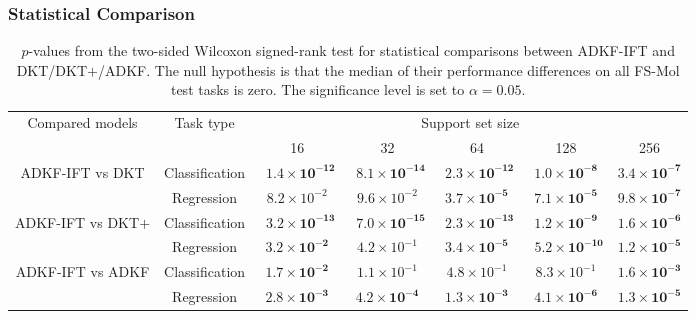         \subsubsection{Statistical Comparison}
        \begin{table}[ht]
            \tiny
            \caption[Results of Wilcoxon signed-rank test for ADKF-IFT's performance.]{$p$-values from the two-sided Wilcoxon signed-rank test for statistical comparisons between ADKF-IFT and DKT/DKT$+$/ADKF. The null hypothesis is that the median of their performance differences on all FS-Mol test tasks is zero. The significance level is set to $\alpha=0.05$.}
            \label{tab:statistical-comparisons}
            \centering
            \begin{tabular}{ccccccc}
                \toprule
                \multirow{2}[3]{*}{Compared models} & \multirow{2}[3]{*}{Task type} & \multicolumn{5}{c}{Support set size}\\
                \cmidrule(lr){3-7}
                & & 16 & 32 & 64 & 128 & 256 \\
                \midrule
                \multirow{2}[1]{*}{ADKF-IFT vs DKT} & Classification & $\;\:\mathbf{1.4\times10^{-12}}$ & $\;\:\mathbf{8.1\times10^{-14}}$ & $\:\,\mathbf{2.3\times10^{-12}}$ & $\mathbf{1.0\times10^{-8}}$ & $\mathbf{3.4\times10^{-7}}$ \\
                & Regression & $8.2\times10^{-2}$ & $9.6\times10^{-2}$ & $\mathbf{3.7\times10^{-5}}$ & $\mathbf{7.1\times10^{-5}}$ & $\mathbf{9.8\times10^{-7}}$ \\
                \midrule
                \multirow{2}[1]{*}{ADKF-IFT vs DKT$+$} & Classification & $\;\:\mathbf{3.2\times10^{-13}}$ & $\;\:\mathbf{7.0\times10^{-15}}$ & $\:\,\mathbf{2.3\times10^{-13}}$ & $\mathbf{1.2\times10^{-9}}$ & $\mathbf{1.6\times10^{-6}}$ \\
                & Regression & $\mathbf{3.2\times10^{-2}}$ & $4.2\times10^{-1}$ & $\mathbf{3.4\times10^{-5}}$ & $\:\:\mathbf{5.2\times10^{-10}}$ & $\mathbf{1.2\times10^{-5}}$ \\
                \midrule
                \multirow{2}[1]{*}{ADKF-IFT vs ADKF} & Classification & $\mathbf{1.7\times10^{-2}}$ & $1.1\times10^{-1}$ & $4.8\times10^{-1}$ & $8.3\times10^{-1}$ & $\mathbf{1.6\times10^{-3}}$ \\
                & Regression & $\mathbf{2.8\times10^{-3}}$ & $\mathbf{4.2\times10^{-4}}$ & $\mathbf{1.3\times10^{-3}}$ & $\mathbf{4.1\times10^{-6}}$ & $\mathbf{1.3\times10^{-5}}$ \\
                \bottomrule
            \end{tabular}
        \end{table}
